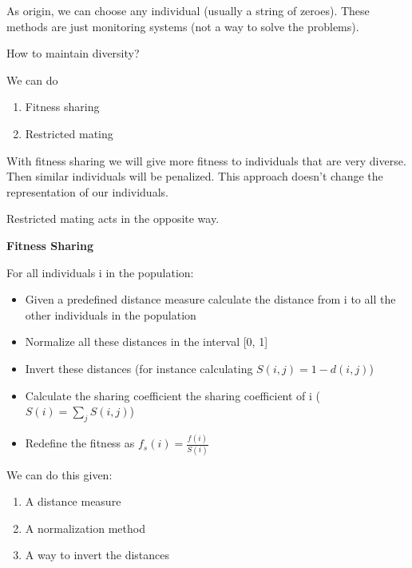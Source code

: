 As origin, we can choose any individual (usually a string of zeroes). These methods are just monitoring systems (not a way to solve the problems).


\vspace{10pt}

How to maintain diversity?

\vspace{10pt}

We can do
\begin{enumerate}
    \item Fitness sharing
    \item Restricted mating
\end{enumerate}

With fitness sharing we will give more fitness to individuals that are very diverse. Then similar individuals will be penalized. This approach doesn't change the representation of our individuals.

\vspace{10pt}

Restricted mating acts in the opposite way. 

\vspace{10pt}
\textbf{Fitness Sharing}
\vspace{10pt}

For all individuals i in the population:

\begin{itemize}
    \item Given a predefined distance measure calculate the distance from i to all the other individuals in the population
    \item Normalize all these distances in the interval [0, 1]
    \item Invert these distances (for instance calculating $S(i, j) = 1-d(i,j)$)
    \item Calculate the sharing coefficient the sharing coefficient of i \ra ($S(i) = \sum_{j}S(i,j)$)
    \item  Redefine the fitness as $f_{s}(i) = \frac{f(i)}{S(i)}$
\end{itemize}

We can do this given:

\begin{enumerate}
    \item A distance measure
    \item A normalization method
    \item A way to invert the distances
\end{enumerate}

